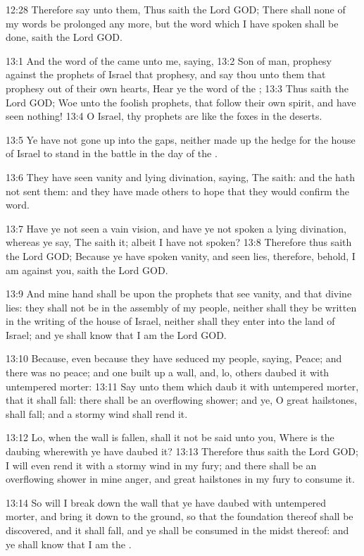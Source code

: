12:28 Therefore say unto them, Thus saith the Lord GOD; There shall
none of my words be prolonged any more, but the word which I have
spoken shall be done, saith the Lord GOD.

13:1 And the word of the \LORD came unto me, saying, 13:2 Son of man,
prophesy against the prophets of Israel that prophesy, and say thou
unto them that prophesy out of their own hearts, Hear ye the word of
the \LORD; 13:3 Thus saith the Lord GOD; Woe unto the foolish prophets,
that follow their own spirit, and have seen nothing!  13:4 O Israel,
thy prophets are like the foxes in the deserts.

13:5 Ye have not gone up into the gaps, neither made up the hedge for
the house of Israel to stand in the battle in the day of the \LORD.

13:6 They have seen vanity and lying divination, saying, The \LORD
saith: and the \LORD hath not sent them: and they have made others to
hope that they would confirm the word.

13:7 Have ye not seen a vain vision, and have ye not spoken a lying
divination, whereas ye say, The \LORD saith it; albeit I have not
spoken?  13:8 Therefore thus saith the Lord GOD; Because ye have
spoken vanity, and seen lies, therefore, behold, I am against you,
saith the Lord GOD.

13:9 And mine hand shall be upon the prophets that see vanity, and
that divine lies: they shall not be in the assembly of my people,
neither shall they be written in the writing of the house of Israel,
neither shall they enter into the land of Israel; and ye shall know
that I am the Lord GOD.

13:10 Because, even because they have seduced my people, saying,
Peace; and there was no peace; and one built up a wall, and, lo,
others daubed it with untempered morter: 13:11 Say unto them which
daub it with untempered morter, that it shall fall: there shall be an
overflowing shower; and ye, O great hailstones, shall fall; and a
stormy wind shall rend it.

13:12 Lo, when the wall is fallen, shall it not be said unto you,
Where is the daubing wherewith ye have daubed it?  13:13 Therefore
thus saith the Lord GOD; I will even rend it with a stormy wind in my
fury; and there shall be an overflowing shower in mine anger, and
great hailstones in my fury to consume it.

13:14 So will I break down the wall that ye have daubed with
untempered morter, and bring it down to the ground, so that the
foundation thereof shall be discovered, and it shall fall, and ye
shall be consumed in the midst thereof: and ye shall know that I am
the \LORD.

